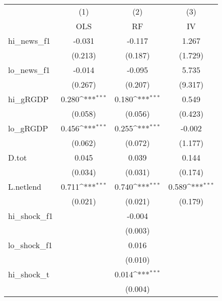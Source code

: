 {
\def\sym#1{\ifmmode^{#1}\else\(^{#1}\)\fi}
\begin{tabular}{l*{3}{c}}
\toprule
            &\multicolumn{1}{c}{(1)}&\multicolumn{1}{c}{(2)}&\multicolumn{1}{c}{(3)}\\
            &\multicolumn{1}{c}{OLS}&\multicolumn{1}{c}{RF}&\multicolumn{1}{c}{IV}\\
\midrule
hi\_news\_f1  &      -0.031         &      -0.117         &       1.267         \\
            &     (0.213)         &     (0.187)         &     (1.729)         \\
\addlinespace
lo\_news\_f1  &      -0.014         &      -0.095         &       5.735         \\
            &     (0.267)         &     (0.207)         &     (9.317)         \\
\addlinespace
hi\_gRGDP    &       0.280\sym{***}&       0.180\sym{***}&       0.549         \\
            &     (0.058)         &     (0.056)         &     (0.423)         \\
\addlinespace
lo\_gRGDP    &       0.456\sym{***}&       0.255\sym{***}&      -0.002         \\
            &     (0.062)         &     (0.072)         &     (1.177)         \\
\addlinespace
D.tot       &       0.045         &       0.039         &       0.144         \\
            &     (0.034)         &     (0.031)         &     (0.174)         \\
\addlinespace
L.netlend   &       0.711\sym{***}&       0.740\sym{***}&       0.589\sym{***}\\
            &     (0.021)         &     (0.021)         &     (0.179)         \\
\addlinespace
hi\_shock\_f1 &                     &      -0.004         &                     \\
            &                     &     (0.003)         &                     \\
\addlinespace
lo\_shock\_f1 &                     &       0.016         &                     \\
            &                     &     (0.010)         &                     \\
\addlinespace
hi\_shock\_t  &                     &       0.014\sym{***}&                     \\
            &                     &     (0.004)         &                     \\

\end{tabular}}
